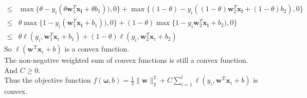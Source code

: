 \documentclass[a4paper]{article}
\begin{document}
\begin{enumerate}
\begin{enumerate}
\begin{equation*}
\begin{aligned}
      \leq &\max \{\theta-y_i (\theta \boldsymbol{w}_{1}^{T}\boldsymbol{x_i}+\theta b_{1}) ), 0\} + \max \{(1-\theta)-y_i ((1-\theta) \boldsymbol{w}_{2}^{T}\boldsymbol{x_i} +(1-\theta) b_{2}), 0\}\\
      \leq &\theta \max \{1-y_i (\boldsymbol{w}_{1}^{T}\boldsymbol{x_i}+b_{1}) ), 0\} + (1-\theta)\max \{1-y_i \boldsymbol{w}_{2}^{T}\boldsymbol{x_i} +b_{2}), 0\}\\ 
      \leq &\theta \ell \left(y_i, \boldsymbol{w}_{1}^{T} \boldsymbol{x}_{i}+b_{1}\right)+(1-\theta) \ell \left(y_i, \boldsymbol{w}_{2}^{T} \boldsymbol{x}_{i}+b_{2}\right)
    \end{aligned}
  \end{equation*}
  So $\ell(\boldsymbol{w}^{\mathrm{T}} \boldsymbol{x}_{i}+b)$ is a convex function.\\
  The non-negative weighted sum of convex functions is still a convex function. And $C \geq 0$. \\
  Thus the objective function $f(\boldsymbol{\omega} ,b) = \frac{1}{2}\|\boldsymbol{w}\|_{2}^{2}+C \sum_{i=1}^{l} \ell\left(y_{i}, \boldsymbol{w}^{\mathrm{T}} \boldsymbol{x}_{i}+b\right)$ is convex.
\end{enumerate}

\end{enumerate}
  
  
  
\end{document}

